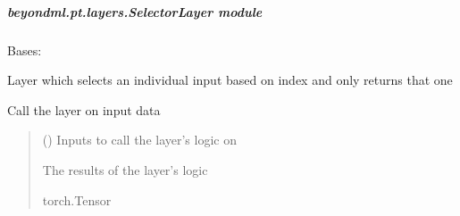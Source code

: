 \documentclass[letterpaper,10pt,english]{sphinxmanual}
\begin{document}
\subparagraph{beyondml.pt.layers.SelectorLayer module}
\label{\detokenize{beyondml.pt.layers:module-beyondml.pt.layers.SelectorLayer}}\label{\detokenize{beyondml.pt.layers:beyondml-pt-layers-selectorlayer-module}}

\begin{fulllineitems}
\label{\detokenize{beyondml.pt.layers:beyondml.pt.layers.SelectorLayer.SelectorLayer}}
\pysigstartsignatures
{}
\pysigstopsignatures
\sphinxAtStartPar
Bases: 

\sphinxAtStartPar
Layer which selects an individual input based on index and only returns that one

\begin{fulllineitems}
\label{\detokenize{beyondml.pt.layers:beyondml.pt.layers.SelectorLayer.SelectorLayer.forward}}
\pysigstartsignatures
{}
\pysigstopsignatures
\sphinxAtStartPar
Call the layer on input data
\begin{quote}\begin{description}
\sphinxAtStartPar
{} () \textendash{} Inputs to call the layer’s logic on

\sphinxAtStartPar
{} \textendash{} The results of the layer’s logic

\sphinxAtStartPar
torch.Tensor

\end{description}\end{quote}

\end{fulllineitems}


\end{fulllineitems}
\end{document}
